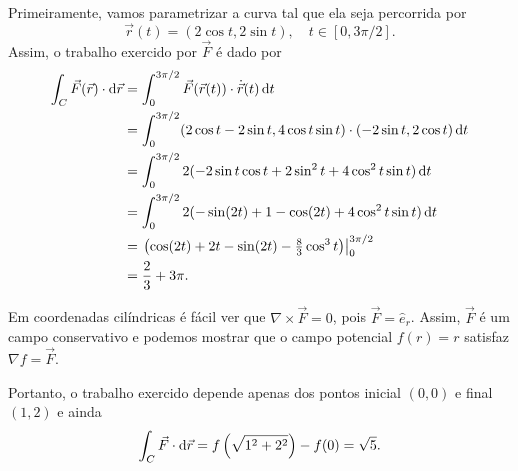 
\begin{questions}

\begin{solution}
    Primeiramente, vamos parametrizar a curva tal que ela seja percorrida por
    \[
        \vec r(t) = (2\cos t,2\sin t), \quad t\in[0,3\pi/2].
    \]
    Assim, o trabalho exercido por $\vec F$ é dado por
    \begin{align*}
    \int_C \vec F(\vec r) \cdot \mathrm{d} \vec r
        &= \int_0^{3\pi/2} \vec F(\vec r(t)) \cdot \dot{\vec r}(t)\,\mathrm{d} t \\
        &= \int_0^{3\pi/2} (2\cos t-2\sin t,4\cos t\sin t)\cdot(-2\sin t,2 \cos t)\,\mathrm{d} t \\
        &= \int_0^{3\pi/2} 2 (-2\sin t\cos t + 2 \sin^2 t + 4 \cos^2 t \sin t)\,\mathrm{d} t \\
        &= \int_0^{3\pi/2} 2 (-\sin (2 t) + 1 - \cos (2 t) + 4 \cos^2 t \sin t)\,\mathrm{d} t\\
        &= \left.\left(\cos (2 t) + 2t - \sin (2 t) - \tfrac{8}{3} \cos^3 t\right)\right|_0^{3\pi/2}\\
        &= \frac{2}{3} + 3\pi.
    \end{align*}
\end{solution}


\begin{solution}
    Em coordenadas cilíndricas é fácil ver que $\nabla \times \vec F = 0$, pois $\vec F = \hat e_r$. Assim, $\vec F$ é um campo conservativo e podemos mostrar que o campo potencial $f(r) = r$ satisfaz $\nabla f = \vec F$.
    
    Portanto, o trabalho exercido depende apenas dos pontos inicial $(0,0)$ e final $(1,2)$ e ainda
    \[
        \int_C \vec F \cdot \mathrm{d} \vec r = f\left(\sqrt{1^2+2^2}\right)-f(0) = \sqrt{5}.
    \]
\end{solution}


\end{questions}

